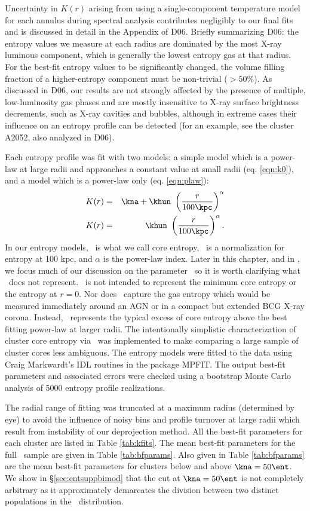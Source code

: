 Uncertainty in $K(r)$ arising from using a single-component
temperature model for each annulus during spectral analysis
contributes negligibly to our final fits and is discussed in detail in
the Appendix of D06. Briefly summarizing D06: the entropy values we
measure at each radius are dominated by the most X-ray luminous
component, which is generally the lowest entropy gas at that
radius. For the best-fit entropy values to be significantly changed,
the volume filling fraction of a higher-entropy component must be
non-trivial ($> 50\%$). As discussed in D06, our results are not
strongly affected by the presence of multiple, low-luminosity gas
phases and are mostly insensitive to X-ray surface brightness
decrements, such as X-ray cavities and bubbles, although in extreme
cases their influence on an entropy profile can be detected (for an
example, see the cluster A2052, also analyzed in D06).

Each entropy profile was fit with two models: a simple model which is
a power-law at large radii and approaches a constant value at small
radii (eq. \ref{eqn:k0}), and a model which is a power-law only
(eq. \ref{eqn:plaw}):
\begin{eqnarray}
K(r) &=& \kna + \khun\ \left(\frac{r}{100 \kpc}\right)^{\alpha}\label{eqn:k0}\\
K(r) &=& \khun\ \left(\frac{r}{100 \kpc}\right)^{\alpha}\label{eqn:plaw}.
\end{eqnarray}
In our entropy models, \kna\ is what we call core entropy, \khun\ is a
normalization for entropy at 100 kpc, and $\alpha$ is the power-law
index. Later in this chapter, and in \citet{haradent}, we focus much of
our discussion on the parameter \kna\ so it is worth clarifying what
\kna\ does not represent. \kna\ is not intended to represent the
minimum core entropy or the entropy at $r=0$. Nor does \kna\ capture
the gas entropy which would be measured immediately around an AGN or
in a compact but extended BCG X-ray corona. Instead, \kna\ represents
the typical excess of core entropy above the best fitting power-law at
larger radii. The intentionally simplistic characterization of cluster
core entropy via \kna\ was implemented to make comparing a large
sample of cluster cores less ambiguous. The entropy models were fitted
to the data using Craig Markwardt's IDL routines in the package
MPFIT. The output best-fit parameters and associated errors were
checked using a bootstrap Monte Carlo analysis of 5000 entropy
profile realizations.

The radial range of fitting was truncated at a maximum radius
(determined by eye) to avoid the influence of noisy bins and profile
turnover at large radii which result from instability of our
deprojection method. All the best-fit parameters for each cluster are
listed in Table \ref{tab:kfits}. The mean best-fit parameters for the
full \accept\ sample are given in Table \ref{tab:bfparams}. Also given
in Table \ref{tab:bfparams} are the mean best-fit parameters for
clusters below and above $\kna = 50 \ent$. We show in
\S\ref{sec:entsuppbimod} that the cut at $\kna=50 \ent$ is not completely
arbitrary as it approximately demarcates the division between two
distinct populations in the \kna\ distribution.

